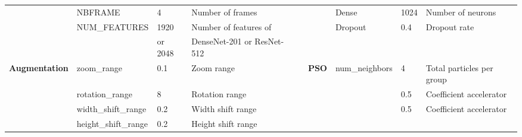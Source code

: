 \documentclass[fleqn,10pt]{wlscirep}
\begin{document}
\begin{table}[htb]
{\begin{tabular}{l|l|l|l|lllll}
\multicolumn{1}{|l|}{}                      & NBFRAME                   & 4              & Number of frames           & \multicolumn{1}{l|}{} & \multicolumn{1}{l|}{}                        & \multicolumn{1}{l|}{Dense}                     & \multicolumn{1}{l|}{1024}           & \multicolumn{1}{l|}{Number of neurons}       \\ \cline{2-4} \cline{7-9} 
\multicolumn{1}{|l|}{}                      & NUM\_FEATURES              & 1920           & Number of features of      & \multicolumn{1}{l|}{} & \multicolumn{1}{l|}{\textbf{}}               & \multicolumn{1}{l|}{Dropout}                   & \multicolumn{1}{l|}{0.4}            & \multicolumn{1}{l|}{Dropout rate}            \\
\multicolumn{1}{|l|}{}                      &                           & or 2048        & DenseNet-201 or ResNet-512 & \multicolumn{1}{l|}{} & \multicolumn{1}{l|}{}                        & \multicolumn{1}{l|}{}                          & \multicolumn{1}{l|}{}               & \multicolumn{1}{l|}{}                        \\ \cline{1-4} \cline{6-9} 
\multicolumn{1}{|l|}{\textbf{Augmentation}} & zoom\_range                & 0.1            & Zoom range                 & \multicolumn{1}{l|}{} & \multicolumn{1}{l|}{\textbf{PSO}}                     & \multicolumn{1}{l|}{num\_neighbors}             & \multicolumn{1}{l|}{4}              & \multicolumn{1}{l|}{Total particles per group}     \\ \cline{2-4} \cline{7-9} 
\multicolumn{1}{|l|}{}                      & rotation\_range            & 8              & Rotation range             & \multicolumn{1}{l|}{} & \multicolumn{1}{l|}{}                        & \multicolumn{1}{l|}{}                        & \multicolumn{1}{l|}{0.5}            & \multicolumn{1}{l|}{Coefficient accelerator} \\ \cline{2-4} \cline{7-9} 
\multicolumn{1}{|l|}{}                      & width\_shift\_range         & 0.2            & Width shift range          & \multicolumn{1}{l|}{} & \multicolumn{1}{l|}{}                        & \multicolumn{1}{l|}{}                        & \multicolumn{1}{l|}{0.5}            & \multicolumn{1}{l|}{Coefficient accelerator} \\ \cline{2-4} \cline{6-9} 
\multicolumn{1}{|l|}{}                      & height\_shift\_range        & 0.2            & Height shift range         &                       &                                              &                                                &                                     &                                              \\ \cline{2-4}

\end{tabular}}
\end{table}
\end{document}
